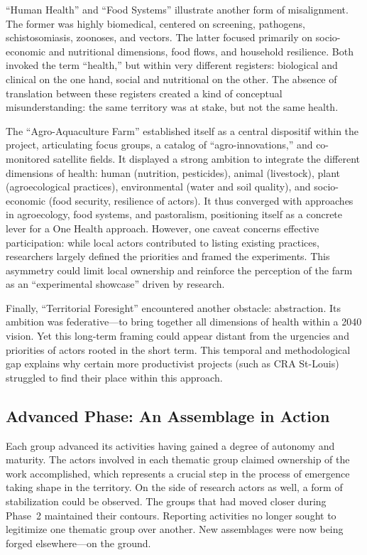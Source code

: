 \documentclass{article}
\begin{document}
“Human Health” and “Food Systems” illustrate another form of misalignment. The former was highly biomedical, centered on screening, pathogens, schistosomiasis, zoonoses, and vectors. The latter focused primarily on socio-economic and nutritional dimensions, food flows, and household resilience. Both invoked the term “health,” but within very different registers: biological and clinical on the one hand, social and nutritional on the other. The absence of translation between these registers created a kind of conceptual misunderstanding: the same territory was at stake, but not the same health.  

The “Agro-Aquaculture Farm” established itself as a central dispositif within the project, articulating focus groups, a catalog of “agro-innovations,” and co-monitored satellite fields. It displayed a strong ambition to integrate the different dimensions of health: human (nutrition, pesticides), animal (livestock), plant (agroecological practices), environmental (water and soil quality), and socio-economic (food security, resilience of actors). It thus converged with approaches in agroecology, food systems, and pastoralism, positioning itself as a concrete lever for a One Health approach. However, one caveat concerns effective participation: while local actors contributed to listing existing practices, researchers largely defined the priorities and framed the experiments. This asymmetry could limit local ownership and reinforce the perception of the farm as an “experimental showcase” driven by research.  

Finally, “Territorial Foresight” encountered another obstacle: abstraction. Its ambition was federative—to bring together all dimensions of health within a 2040 vision. Yet this long-term framing could appear distant from the urgencies and priorities of actors rooted in the short term. This temporal and methodological gap explains why certain more productivist projects (such as CRA St-Louis) struggled to find their place within this approach.  

\subsection{Advanced Phase: An Assemblage in Action}\label{sec:phaseAgencements}

Each group advanced its activities having gained a degree of autonomy and maturity. The actors involved in each thematic group claimed ownership of the work accomplished, which represents a crucial step in the process of emergence taking shape in the territory. On the side of research actors as well, a form of stabilization could be observed. The groups that had moved closer during Phase~2 maintained their contours. Reporting activities no longer sought to legitimize one thematic group over another. New assemblages were now being forged elsewhere—on the ground.  
\end{document}
